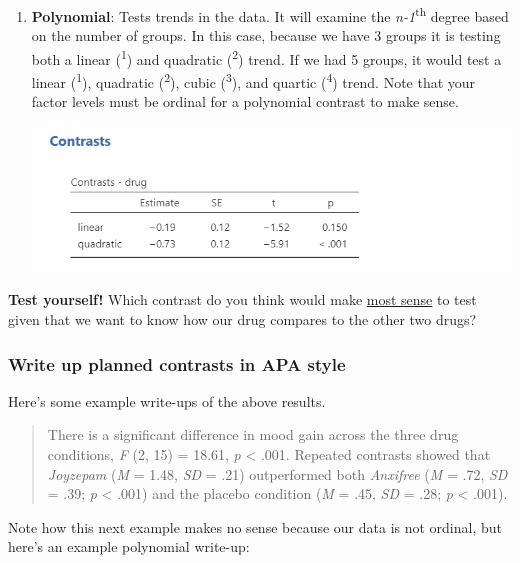 \documentclass[
]{book}
\begin{document}
\begin{enumerate}
\def\labelenumi{\arabic{enumi}.}
\setcounter{enumi}{5}
\item
  \textbf{Polynomial}: Tests trends in the data. It will examine the \emph{n-1}\textsuperscript{th} degree based on the number of groups. In this case, because we have 3 groups it is testing both a linear (\textsuperscript{1}) and quadratic (\textsuperscript{2}) trend. If we had 5 groups, it would test a linear (\textsuperscript{1}), quadratic (\textsuperscript{2}), cubic (\textsuperscript{3}), and quartic (\textsuperscript{4}) trend. Note that your factor levels must be ordinal for a polynomial contrast to make sense.

  \includegraphics{images/04_one-way-anova/contrasts_polynomial.png}
\end{enumerate}

\textbf{Test yourself!} Which contrast do you think would make \underline{most sense} to test given that we want to know how our drug compares to the other two drugs?

\hypertarget{write-up-planned-contrasts-in-apa-style}{%
\subsubsection{Write up planned contrasts in APA style}\label{write-up-planned-contrasts-in-apa-style}}

Here's some example write-ups of the above results.

\begin{quote}
There is a significant difference in mood gain across the three drug conditions, \emph{F} (2, 15) = 18.61, \emph{p} \textless{} .001. Repeated contrasts showed that \emph{Joyzepam} (\emph{M} = 1.48, \emph{SD} = .21) outperformed both \emph{Anxifree} (\emph{M} = .72, \emph{SD} = .39; \emph{p} \textless{} .001) and the placebo condition (\emph{M} = .45, \emph{SD} = .28; \emph{p} \textless{} .001).
\end{quote}

Note how this next example makes no sense because our data is not ordinal, but here's an example polynomial write-up:
\end{document}
